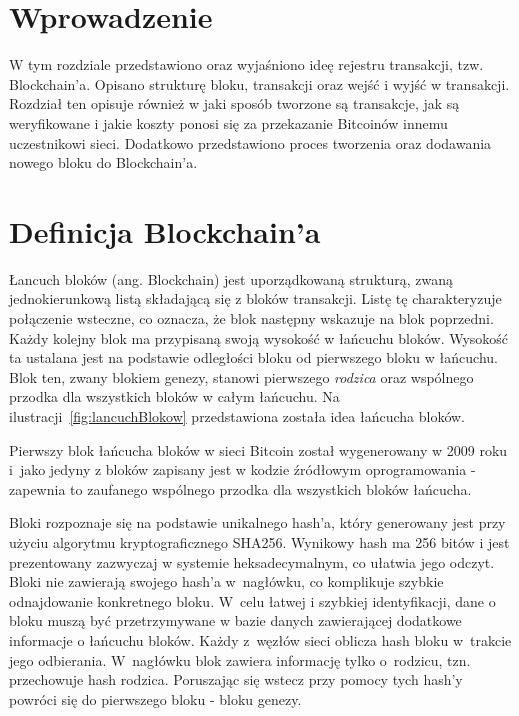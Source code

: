\documentclass[12pt, twoside, final, openany]{mgr}
\begin{document}
\section{Wprowadzenie}
\indent W tym rozdziale przedstawiono oraz wyjaśniono ideę rejestru transakcji, tzw. Blockchain'a. Opisano strukturę bloku, transakcji oraz wejść i wyjść w transakcji. Rozdział ten opisuje również w jaki sposób tworzone są transakcje, jak są weryfikowane i jakie koszty ponosi się za przekazanie Bitcoinów innemu uczestnikowi sieci. Dodatkowo przedstawiono proces tworzenia oraz dodawania nowego bloku do Blockchain'a. 

\section{Definicja Blockchain'a}
\label{definicjaBlockchaina}
\indent Łancuch bloków (ang. Blockchain) jest uporządkowaną strukturą, zwaną jednokierunkową listą składającą się z bloków transakcji. Listę tę charakteryzuje połączenie wsteczne, co oznacza, że blok następny wskazuje na blok poprzedni. Każdy kolejny blok ma przypisaną swoją wysokość w łańcuchu bloków. Wysokość ta ustalana jest na podstawie odległości bloku od pierwszego bloku w łańcuchu. Blok ten, zwany blokiem genezy, stanowi pierwszego \textit{rodzica} oraz wspólnego przodka dla wszystkich bloków w całym łańcuchu\cite{BitcoinAndCryptocurrencyTechnologies, BlockchainExplained, BitcoinAndTheBlockchain}. Na ilustracji~\ref{fig:lancuchBlokow} przedstawiona została idea łańcucha bloków.

\indent Pierwszy blok łańcucha bloków w sieci Bitcoin został wygenerowany w 2009 roku i~jako jedyny z bloków zapisany jest w kodzie źródłowym oprogramowania - zapewnia to zaufanego wspólnego przodka dla wszystkich bloków łańcucha.

\indent Bloki rozpoznaje się na podstawie unikalnego hash'a, który generowany jest przy użyciu algorytmu kryptograficznego SHA256\cite{sha2}. Wynikowy hash ma 256 bitów i jest prezentowany zazwyczaj w systemie heksadecymalnym, co ułatwia jego odczyt. Bloki nie zawierają swojego hash'a w~nagłówku, co komplikuje szybkie odnajdowanie konkretnego bloku. W~celu łatwej i szybkiej identyfikacji, dane o bloku muszą być przetrzymywane w bazie danych zawierającej dodatkowe informacje o łańcuchu bloków. Każdy z~węzłów sieci oblicza hash bloku w~trakcie jego odbierania. W~nagłówku blok zawiera informację tylko o~rodzicu, tzn. przechowuje hash rodzica. Poruszając się wstecz przy pomocy tych hash'y powróci się do pierwszego bloku - bloku genezy. 
\end{document}
